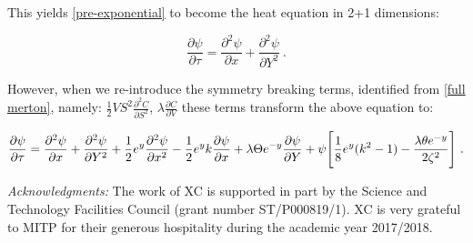 \documentclass[english,12pt]{article}
\begin{document}
This yields \ref{pre-exponential} to become the heat equation in 2+1 dimensions:


\begin{equation}
\frac{\partial \psi}{\partial \tau} = \frac{\partial^2 \psi}{\partial x} + \frac{\partial^2 \psi}{\partial Y^2}~.
\end{equation}





However, when we re-introduce the symmetry breaking terms, identified from \ref{full merton}, namely: $\frac{1}{2} V S^2 \frac{\partial^2 C}{\partial S^2}$,  $\lambda \frac{\partial C}{\partial V} $ these terms transform the above equation to: 

\begin{equation}
\frac{\partial \psi}{\partial \tau} = \frac{\partial^2 \psi}{\partial x} + \frac{\partial^2 \psi}{\partial Y^2} + \frac{1}{2}e^{y}\frac{\partial^2 \psi}{\partial x^2} -\frac{1}{2}e^{y}k\frac{\partial \psi}{\partial x} + \lambda\Theta e^{-y}\frac{\partial\psi}{\partial Y} + \psi \Bigg{[} \frac{1}{8}e^{y}(k^{2} - 1) - \frac{\lambda\theta e^{-y}}{2\zeta^{2}} \Bigg{]}~.
\end{equation}
















{\it Acknowledgments:}
The work of XC is supported in part  by the Science and Technology Facilities Council (grant number  ST/P000819/1). XC is very grateful to MITP for their generous hospitality during the academic year 2017/2018. 



\bigskip{}


\baselineskip=1.6pt 

\begin{thebibliography}{10}

   
\end{thebibliography}
\end{document}
